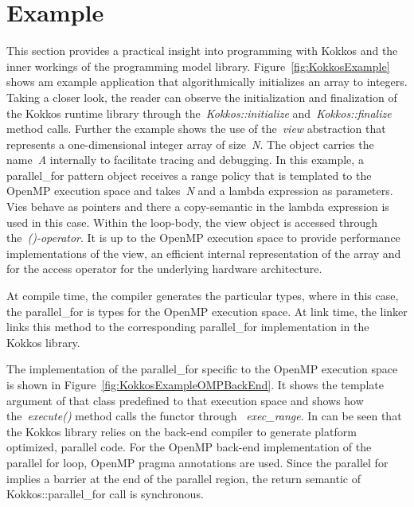 \section{Example}\label{chap:kokkosExample}

This section provides a practical insight into programming with Kokkos and the inner workings of the programming model library. Figure~\ref{fig:KokkosExample} shows am example application that algorithmically initializes an array to integers. Taking a closer look, the reader can observe the initialization and finalization of the Kokkos runtime library through the~\emph{Kokkos::initialize} and~\emph{Kokkos::finalize} method calls. Further the example shows the use of the~\emph{view} abstraction that represents a one-dimensional integer array of size~\emph{N}. The object carries the name~\emph{A} internally to facilitate tracing and debugging. In this example, a parallel\_for pattern object receives a range policy that is templated to the OpenMP execution space and takes~\emph{N} and a lambda expression as parameters. Vies behave as pointers and there a copy-semantic in the lambda expression is used in this case. Within the loop-body, the view object is accessed through the~\emph{()-operator}. It is up to the OpenMP execution space to provide performance implementations of the view, an efficient internal representation of the array and for the access operator for the underlying hardware architecture.

At compile time, the compiler generates the particular types, where in this case, the parallel\_for is types for the OpenMP execution space. At link time, the linker links this method to the corresponding parallel\_for implementation in the Kokkos library.

The implementation of the parallel\_for specific to the OpenMP execution space is shown in Figure~\ref{fig:KokkosExampleOMPBackEnd}. It shows the template argument of that class predefined to that execution space and shows how the~\emph{execute()} method calls the functor through ~\emph{exec\_range}. In can be seen that the Kokkos library relies on the back-end compiler to generate platform optimized, parallel code. For the OpenMP back-end implementation of the parallel for loop, OpenMP pragma annotations are used. Since the parallel for implies a barrier at the end of the parallel region, the return semantic of Kokkos::parallel\_for call is synchronous. 




